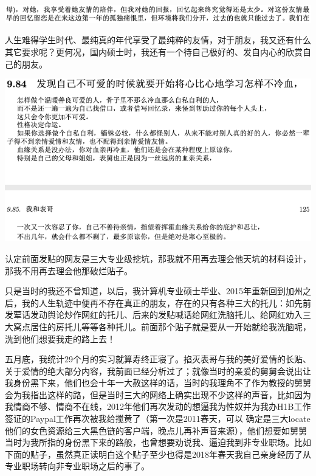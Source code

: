 \documentclass[9pt, b5paper]{article}
\begin{document}
\begin{center}
\includegraphics[width=.9\linewidth]{./pic/backups_plans_20210413_170854.png}
\end{center}

人生难得学生时代、最纯真的年代享受了最纯粹的友情，对于朋友，我又还有什么其它要求呢？更何况，国内硕士时，我还有一个待自己极好的、发自内心的欣赏自己的朋友。

\begin{center}
\includegraphics[width=.9\linewidth]{./pic/backups_plans_20210417_231336.png}
\end{center}

认定前面发贴的网友是三大专业级挖坑，那我就不用再去理会他天坑的材料设计，那我不用再去理会他那破烂贴子。

只是当时的我还不曾知道，以后，我计算机专业硕士毕业、2015年重新回到加州之后，我的人生轨迹中便再不存在真正的朋友，存在的只有各种三大的托儿：如先前发荤话发动舆论炒作网红的托儿、后来的发贴喊话给网红洗脑托儿、给网红劝入三大窝点居住的房托儿等等各种托儿。前面那个贴子就是要从一开始就给我洗脑呢，洗到他们想要我走的路上去！

五月底，我统计29个月的实习就算寿终正寝了。掐灭表哥与我的美好爱情的长贴、关于爱情的绝大部分内容，我前面已经分析过了；就像当时的亲爱的舅舅会说出让我身份黑下来，他们也会十年一大赦这样的话，当时的我理角不了作为教授的舅舅会为我指出这样的路，但是当时三大的网络上确实出现不少这样的声音，比如因为我情商不够、情商不在线，2012年他们再次发动的想逼我为性奴并为我办H1B工作签证的Paypal工作再次被我给搅黄了（第一次是2011春天，可以
确定是三大locate他们的女色资源给三大黑色链的客户端，晚点儿再补声音来源），他们想要如舅舅当时为我所指的身份黑下来的路般，也曾想要劝说我、逼迫我到非专业职场。比如下面的贴子，虽然真正读明白这个贴子至少也得是2018年春天我自己亲身经历了从专业职场转向非专业职场之后的事了。
\end{document}
